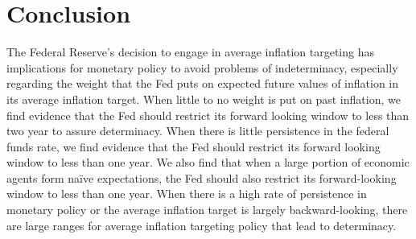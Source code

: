 \documentclass[english,authoryear,12pt]{elsarticle}
\begin{document}
\section{Conclusion}

The Federal Reserve's decision to engage in average inflation targeting has implications for monetary policy to avoid problems of indeterminacy, especially regarding the weight that the Fed puts on expected future values of inflation in its average inflation target. When little to no weight is put on past inflation, we find evidence that the Fed should restrict its forward looking window to less than two year to assure determinacy. When there is little persistence in the federal funds rate, we find evidence that the Fed should restrict its forward looking window to less than one year. We also find that when a large portion of economic agents form na\"ive expectations, the Fed should also restrict its forward-looking window to less than one year. When there is a high rate of persistence in monetary policy or the average inflation target is largely backward-looking, there are large ranges for average inflation targeting policy that lead to determinacy.



\end{document}

